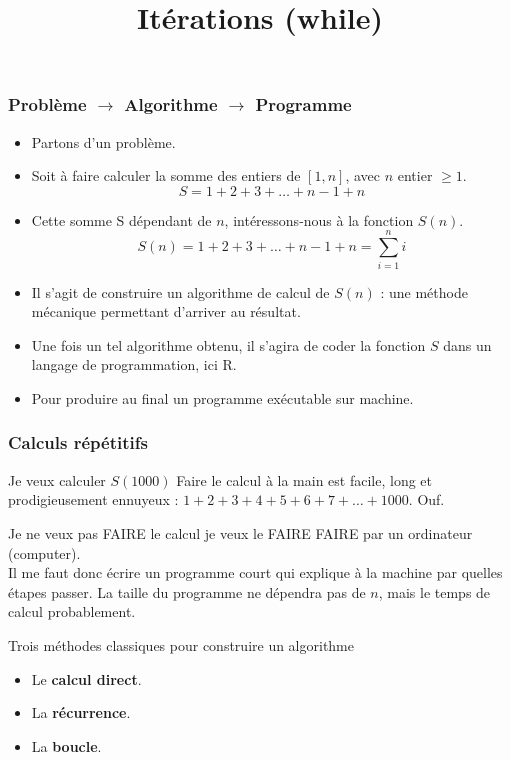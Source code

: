 \documentclass[10pt]{beamer}
\title{Itérations (while)}
\begin{document}
\maketitle

\begin{frame}
  \frametitle{Problème $\rightarrow$ Algorithme $\rightarrow$ Programme}


  \begin{itemize}
  \item Partons d'un \alert{problème}.
  \item Soit à faire calculer la somme des entiers de $[1,n]$, avec $n$ entier $\geq 1$.
    \[
      S = 1 + 2 + 3 + \ldots + n-1 + n
    \]
  \item Cette somme S dépendant de $n$, intéressons-nous à la fonction $S(n)$.
    \[
      S(n) = 1 + 2 + 3 + \ldots + n-1 + n = \sum_{i=1}^n i
    \]
  \item Il s'agit de construire un \alert{algorithme} de calcul de $S(n)$ : une \alert{méthode mécanique} permettant d'arriver au résultat.
  \item Une fois un tel algorithme obtenu, il s'agira de coder la fonction $S$ dans un langage de programmation, ici R.
  \item Pour produire au final un \alert{programme exécutable} sur machine.
  \end{itemize}

\end{frame}

\begin{frame}
  \frametitle{Calculs répétitifs}

  \begin{block}{Je veux calculer $S(1000)$}
    Faire le calcul à la main est facile, long et prodigieusement ennuyeux : $1 + 2 + 3 + 4 + 5 + 6 +7 + \ldots + 1000$. Ouf.
  \end{block}

  \begin{block}{Je ne veux pas FAIRE le calcul}
    je veux le FAIRE FAIRE par un ordinateur (computer). \\
    Il me faut donc écrire un programme court qui explique à la machine par quelles étapes passer.
    La taille du programme ne dépendra pas de $n$, mais le temps de calcul probablement.
  \end{block}

  \begin{alertblock}{Trois méthodes classiques pour construire un algorithme}
    \begin{itemize}
    \item Le \alert{\textbf{calcul direct}}.
    \item La \alert{\textbf{récurrence}}.
    \item La \alert{\textbf{boucle}}.
    \end{itemize}
  \end{alertblock}
\end{frame}
\end{document}
